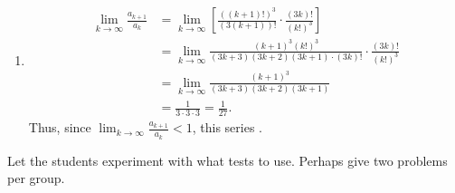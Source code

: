 \documentclass[handout]{ximera}
\begin{document}
\begin{problem}
\begin{freeResponse}
\begin{enumerate}
%		
%		
%		
%	
%		
	

		\item {}
		\begin{align*}
			\lim_{k \to \infty} \frac{a_{k+1}}{a_k} 
			&= \lim_{k \to \infty} \left[ \frac{( (k+1)!)^3}{(3(k+1))!}  \cdot \frac{(3k)!}{(k!)^3} \right]  \\
			&= \lim_{k \to \infty} \frac{ (k+1)^3 (k!)^3}{(3k+3)(3k+2)(3k+1) \cdot (3k)!} \cdot \frac{(3k)!}{(k!)^3} \\
			&= \lim_{k \to \infty} \frac{(k+1)^3}{(3k+3)(3k+2)(3k+1)}  \\
			&= \frac{1}{3 \cdot 3 \cdot 3}= \frac{1}{27}.
			\end{align*}
		Thus, since $\lim_{k \to \infty} \frac{a_{k+1}}{a_k} < 1$, this series . 
		
		\end{enumerate}
	\end{freeResponse}
	
\end{problem}

\begin{instructorNotes}
Let the students experiment with what tests to use.  
Perhaps give two problems per group.
\end{instructorNotes}
\end{document}
